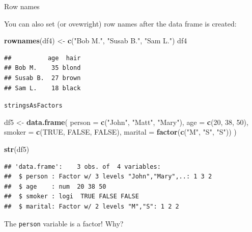 \documentclass[ignorenonframetext,]{beamer}
\newenvironment{Shaded}{\begin{snugshade}}{\end{snugshade}}
\newcommand{\DataTypeTok}[1]{\textcolor[rgb]{0.13,0.29,0.53}{#1}}
\newcommand{\DecValTok}[1]{\textcolor[rgb]{0.00,0.00,0.81}{#1}}
\newcommand{\KeywordTok}[1]{\textcolor[rgb]{0.13,0.29,0.53}{\textbf{#1}}}
\newcommand{\NormalTok}[1]{#1}
\newcommand{\OtherTok}[1]{\textcolor[rgb]{0.56,0.35,0.01}{#1}}
\newcommand{\StringTok}[1]{\textcolor[rgb]{0.31,0.60,0.02}{#1}}
\begin{document}
\begin{frame}[fragile]{Row names}
\protect\hypertarget{row-names-1}{}

You can also set (or ovewright) row names after the data frame is
created:

\begin{Shaded}
\begin{Highlighting}[]
\KeywordTok{rownames}\NormalTok{(df4) <-}\StringTok{ }\KeywordTok{c}\NormalTok{(}\StringTok{"Bob M."}\NormalTok{, }\StringTok{"Susab B."}\NormalTok{, }\StringTok{"Sam L."}\NormalTok{) }
\NormalTok{df4}
\end{Highlighting}
\end{Shaded}

\begin{verbatim}
##          age  hair
## Bob M.    35 blond
## Susab B.  27 brown
## Sam L.    18 black
\end{verbatim}

\end{frame}

\begin{frame}[fragile]{\texttt{stringsAsFactors}}
\protect\hypertarget{stringsasfactors}{}

\begin{Shaded}
\begin{Highlighting}[]
\NormalTok{df5 <-}\StringTok{ }\KeywordTok{data.frame}\NormalTok{(}
  \DataTypeTok{person =} \KeywordTok{c}\NormalTok{(}\StringTok{"John"}\NormalTok{, }\StringTok{"Matt"}\NormalTok{, }\StringTok{"Mary"}\NormalTok{),}
  \DataTypeTok{age =} \KeywordTok{c}\NormalTok{(}\DecValTok{20}\NormalTok{, }\DecValTok{38}\NormalTok{, }\DecValTok{50}\NormalTok{),}
  \DataTypeTok{smoker =} \KeywordTok{c}\NormalTok{(}\OtherTok{TRUE}\NormalTok{, }\OtherTok{FALSE}\NormalTok{, }\OtherTok{FALSE}\NormalTok{),}
  \DataTypeTok{marital =} \KeywordTok{factor}\NormalTok{(}\KeywordTok{c}\NormalTok{(}\StringTok{"M"}\NormalTok{, }\StringTok{"S"}\NormalTok{, }\StringTok{"S"}\NormalTok{))}
\NormalTok{)}

\KeywordTok{str}\NormalTok{(df5)}
\end{Highlighting}
\end{Shaded}

\begin{verbatim}
## 'data.frame':    3 obs. of  4 variables:
##  $ person : Factor w/ 3 levels "John","Mary",..: 1 3 2
##  $ age    : num  20 38 50
##  $ smoker : logi  TRUE FALSE FALSE
##  $ marital: Factor w/ 2 levels "M","S": 1 2 2
\end{verbatim}

The \texttt{person} variable is a factor! Why?

\end{frame}
\end{document}
